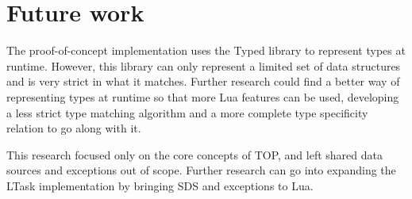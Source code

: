 \section{Future work}
The proof-of-concept implementation uses the Typed library to represent types at runtime. However, this library can only represent a limited set of data structures and is very strict in what it matches. Further research could find a better way of representing types at runtime so that more Lua features can be used, developing a less strict type matching algorithm and a more complete type specificity relation to go along with it.

This research focused only on the core concepts of TOP, and left shared data sources and exceptions out of scope. Further research can go into expanding the LTask implementation by bringing SDS and exceptions to Lua.

